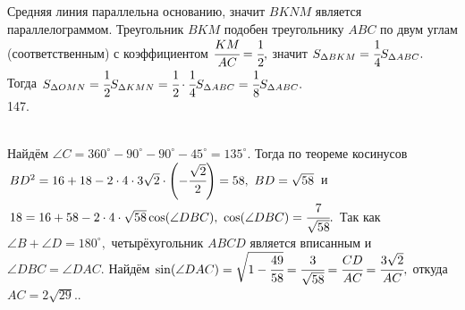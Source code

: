 \documentclass[12pt]{article}
\begin{document}
Средняя линия параллельна основанию, значит $BKNM$ является параллелограммом. Треугольник $BKM$ подобен треугольнику $ABC$ по двум углам (соответственным) с коэффициентом $\cfrac{KM}{AC}=\cfrac{1}{2},$ значит $S_{\Delta BKM}=\cfrac{1}{4}S_{\Delta ABC}.$ Тогда $S_{\Delta OMN}=\cfrac{1}{2}S_{\Delta KMN}=\cfrac{1}{2}\cdot\cfrac{1}{4}S_{\Delta ABC}=\cfrac{1}{8}S_{\Delta ABC}.$\\
147. \begin{figure}[ht!]
\end{figure}\\
Найдём $\angle C=360^\circ-90^\circ-90^\circ-45^\circ=135^\circ.$ Тогда по теореме косинусов $BD^2=16+18-2\cdot4\cdot3\sqrt{2}\cdot\left(-\cfrac{\sqrt{2}}{2}\right)=58,\ BD=\sqrt{58}$ и $18=16+58-2\cdot4\cdot\sqrt{58}\cos(\angle DBC),\ \cos(\angle DBC)=\cfrac{7}{\sqrt{58}}.$ Так как $\angle B+\angle D=180^\circ,$ четырёхугольник $ABCD$ является вписанным и $\angle DBC=\angle DAC.$ Найдём $\sin(\angle DAC)=\sqrt{1-\cfrac{49}{58}}=\cfrac{3}{\sqrt{58}}=\cfrac{CD}{AC}=\cfrac{3\sqrt{2}}{AC},$ откуда $AC=2\sqrt{29}.$\newpage{}. \begin{figure}[ht!]
\end{figure}\\
\end{document}
